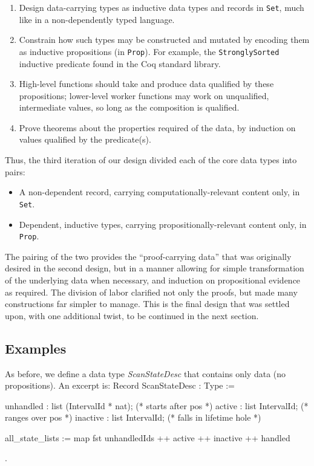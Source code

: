 \documentclass{llncs}
\newenvironment{MyCoqUneval}{\small \verbatim}{\endverbatim \normalsize}
\begin{document}
\begin{enumerate}
\item Design data-carrying types as inductive data types and records in
  \texttt{Set}, much like in a non-dependently typed language.

\item Constrain how such types may be constructed and mutated by encoding them
  as inductive propositions (in \texttt{Prop}).  For example, the
  \texttt{StronglySorted} inductive predicate found in the Coq standard
  library.

\item High-level functions should take and produce data qualified by these
  propositions; lower-level worker functions may work on unqualified,
  intermediate values, so long as the composition is qualified.

\item Prove theorems about the properties required of the data, by induction
  on values qualified by the predicate(s).

\end{enumerate}

Thus, the third iteration of our design divided each of the core data types
into pairs:

\begin{itemize}
\item A non-dependent record, carrying computationally-relevant content only,
  in \texttt{Set}.

\item Dependent, inductive types, carrying propositionally-relevant content
  only, in \texttt{Prop}.
\end{itemize}

The pairing of the two provides the ``proof-carrying data'' that was
originally desired in the second design, but in a manner allowing for simple
transformation of the underlying data when necessary, and induction on
propositional evidence as required.  The division of labor clarified not only
the proofs, but made many constructions far simpler to manage.  This is the
final design that was settled upon, with one additional twist, to be continued
in the next section.

\subsection{Examples}
\label{sec:examplesv3}

As before, we define a data type \emph{ScanStateDesc} that contains
only data (no propositions). An excerpt is:
\begin{MyCoqUneval}
Record ScanStateDesc : Type := {
    unhandled : list (IntervalId * nat);   (* starts after pos *)
    active    : list IntervalId;           (* ranges over pos *)
    inactive  : list IntervalId;           (* falls in lifetime hole *)

    all_state_lists := map fst unhandledIds ++
                       active ++ inactive ++ handled
}.
\end{MyCoqUneval}
\end{document}
